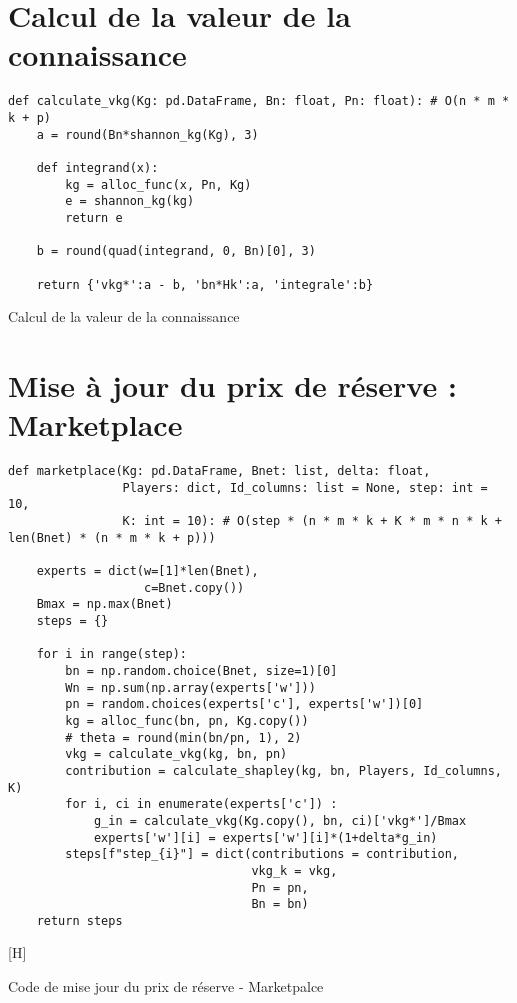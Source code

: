 \section{Calcul de la valeur de la connaissance} \label{ansec:vkg_compute}
\begin{listing} [H]
\begin{verbatim}
def calculate_vkg(Kg: pd.DataFrame, Bn: float, Pn: float): # O(n * m * k + p)
    a = round(Bn*shannon_kg(Kg), 3)

    def integrand(x):
        kg = alloc_func(x, Pn, Kg)
        e = shannon_kg(kg)
        return e

    b = round(quad(integrand, 0, Bn)[0], 3)

    return {'vkg*':a - b, 'bn*Hk':a, 'integrale':b}
\end{verbatim}
\caption{Calcul de la valeur de la connaissance}
\label{code:vkg_compute}
\end{listing}


\section{Mise à jour du prix de réserve : Marketplace} \label{ansec:priceupdate_compute}
\begin{listing} [H]
\begin{verbatim}
def marketplace(Kg: pd.DataFrame, Bnet: list, delta: float,
                Players: dict, Id_columns: list = None, step: int = 10,
                K: int = 10): # O(step * (n * m * k + K * m * n * k + len(Bnet) * (n * m * k + p)))

    experts = dict(w=[1]*len(Bnet),
                   c=Bnet.copy())
    Bmax = np.max(Bnet)
    steps = {}
    
    for i in range(step):
        bn = np.random.choice(Bnet, size=1)[0]
        Wn = np.sum(np.array(experts['w']))
        pn = random.choices(experts['c'], experts['w'])[0]
        kg = alloc_func(bn, pn, Kg.copy())
        # theta = round(min(bn/pn, 1), 2)
        vkg = calculate_vkg(kg, bn, pn)
        contribution = calculate_shapley(kg, bn, Players, Id_columns, K)
        for i, ci in enumerate(experts['c']) :
            g_in = calculate_vkg(Kg.copy(), bn, ci)['vkg*']/Bmax
            experts['w'][i] = experts['w'][i]*(1+delta*g_in)
        steps[f"step_{i}"] = dict(contributions = contribution,
                                  vkg_k = vkg,
                                  Pn = pn,
                                  Bn = bn)   
    return steps
\end{verbatim} [H]
\caption{Code de mise jour du prix de réserve - Marketpalce}
\label{code:priceupdate_compute}
\end{listing}


